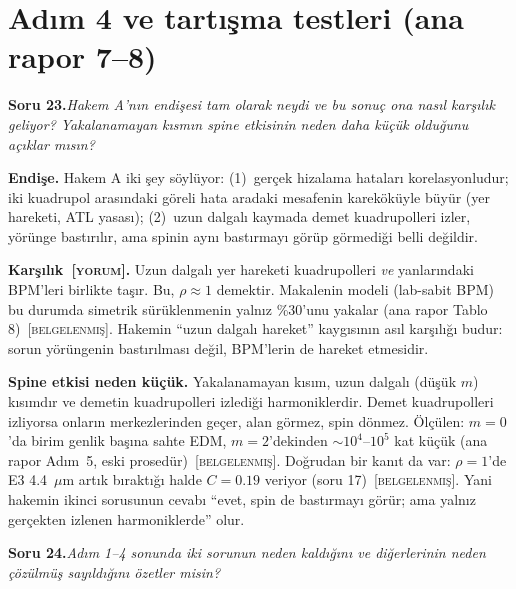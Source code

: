 \documentclass[11pt,a4paper]{article}
\newcommand{\BEL}{\textsc{[belgelenmiş]}}
\newcommand{\YOR}{\textsc{[yorum]}}
\newcounter{soru}
\newcommand{\soru}[2]{%
  \par\medskip\noindent\textbf{Soru #1.}\enspace\textit{#2}\par\nopagebreak\smallskip}
\begin{document}
\section{Adım 4 ve tartışma testleri (ana rapor 7--8)}

\soru{23}{Hakem A'nın endişesi tam olarak neydi ve bu sonuç ona nasıl karşılık geliyor? Yakalanamayan
kısmın spine etkisinin neden daha küçük olduğunu açıklar mısın?}

\textbf{Endişe.} Hakem A iki şey söylüyor: (1)~gerçek hizalama hataları korelasyonludur; iki kuadrupol
arasındaki göreli hata aradaki mesafenin kareköküyle büyür (yer hareketi, ATL yasası); (2)~uzun dalgalı
kaymada demet kuadrupolleri izler, yörünge bastırılır, ama spinin aynı bastırmayı görüp görmediği belli
değildir.

\textbf{Karşılık~\YOR.} Uzun dalgalı yer hareketi kuadrupolleri \emph{ve} yanlarındaki BPM'leri birlikte
taşır. Bu, $\rho\approx1$ demektir. Makalenin modeli (lab-sabit BPM) bu durumda simetrik sürüklenmenin
yalnız \%30'unu yakalar (ana rapor Tablo 8)~\BEL. Hakemin ``uzun dalgalı hareket'' kaygısının asıl
karşılığı budur: sorun yörüngenin bastırılması değil, BPM'lerin de hareket etmesidir.

\textbf{Spine etkisi neden küçük.} Yakalanamayan kısım, uzun dalgalı (düşük $m$) kısımdır ve demetin
kuadrupolleri izlediği harmoniklerdir. Demet kuadrupolleri izliyorsa onların merkezlerinden geçer, alan
görmez, spin dönmez. Ölçülen: $m=0$'da birim genlik başına sahte EDM, $m=2$'dekinden $\sim10^4$--$10^5$
kat küçük (ana rapor Adım~5, eski prosedür)~\BEL. Doğrudan bir kanıt da var: $\rho=1$'de E3 4.4~$\mu$m
artık bıraktığı halde $C=0.19$ veriyor (soru 17)~\BEL. Yani hakemin ikinci sorusunun cevabı ``evet, spin de
bastırmayı görür; ama yalnız gerçekten izlenen harmoniklerde'' olur.

\soru{24}{Adım 1--4 sonunda iki sorunun neden kaldığını ve diğerlerinin neden çözülmüş sayıldığını
özetler misin?}
\end{document}
